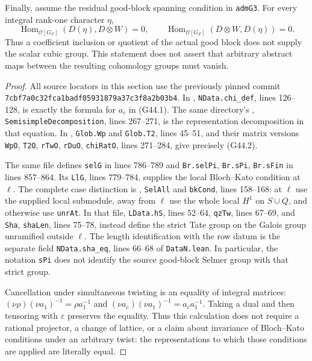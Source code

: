 \begin{proposition}
Finally, assume the residual good-block spanning condition in
\texttt{admG3}.  For every integral rank-one character $\eta$,
\[
 \operatorname{Hom}_{\mathcal O[G_F]}
       (D(\eta),D\otimes W)=0,
 \qquad
 \operatorname{Hom}_{\mathcal O[G_F]}
       (D\otimes W,D(\eta))=0.                       \tag{G44.3}
\]
Thus a coefficient inclusion or quotient of the actual good
block does not supply the scalar cubic group.  This statement
does not assert that arbitrary abstract maps between the resulting
cohomology groups must vanish.
\end{proposition}
\begin{proof}
All source locators in this section use the previously pinned
commit \texttt{7cbf7a0c32fca1badf05931879a37c3f8a2b03b4}.
In ,
\texttt{NData.chi\_def}, lines 126--128, is exactly the formula
for $a_c$ in (G44.1).  The same directory's
,
\texttt{SemisimpleDecomposition}, lines 267--271, is the
representation decomposition in that equation.
In ,
\texttt{Glob.Wp} and \texttt{Glob.T2}, lines 45--51,
and their matrix versions \texttt{WpO}, \texttt{T2O},
\texttt{rTwO}, \texttt{rDuO}, \texttt{chiRatO},
lines 271--284, give precisely (G44.2).

The same file defines \texttt{selG} in lines 786--789 and
\texttt{Br.selPi}, \texttt{Br.sPi}, \texttt{Br.sFin} in
lines 857--864.  Its \texttt{LlG}, lines 779--784, supplies
the local Bloch--Kato condition at $\ell$.
The complete case distinction is
,
\texttt{SelAll} and \texttt{bkCond}, lines 158--168:
at $\ell$ use the supplied local submodule, away from $\ell$
use the whole local $H^1$ on $S\cup Q$, and otherwise use
\texttt{unrAt}.
In that file, \texttt{LData.hS}, lines 52--64,
\texttt{qzTw}, lines 67--69, and \texttt{Sha},
\texttt{shaLen}, lines 75--78, instead define the strict
Tate group on the Galois group unramified outside $\ell$.
The length identification with the row datum is the separate
field \texttt{NData.sha\_eq}, lines 66--68 of \texttt{DataN.lean}.
In particular, the notation \texttt{sPi} does not identify the
source good-block Selmer group with that strict group.

Cancellation under simultaneous twisting is an equality of
integral matrices:
$(\nu\rho)(\nu a_1)^{-1}=\rho a_1^{-1}$ and
$(\nu a_c)(\nu a_1)^{-1}=a_ca_1^{-1}$.
Taking a dual and then tensoring with $\varepsilon$ preserves
the equality.  Thus this calculation does not require a
rational projector, a change of lattice, or a claim about
invariance of Bloch--Kato conditions under an arbitrary twist:
the representations to which those conditions are applied are
literally equal.


\end{proof}
